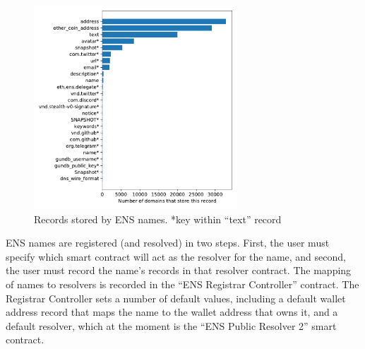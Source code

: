 \begin{figure}[t]
	\centering
	\includegraphics[width=3in]{figs/ens_names.pdf}
	\caption{Records stored by ENS names. *key within ``text'' record}
	\label{fig:ens_records}
\end{figure}

ENS names are registered (and resolved) in two steps. First, 
the user must specify which smart contract will act as the 
resolver for the name, and second, the user must record the 
name's records in 
that resolver contract. The mapping of names to resolvers is 
recorded in the ``ENS Registrar 
Controller'' contract. The Registrar Controller sets a number 
of default values, including a default wallet 
address record that maps the name to the wallet address that 
owns it, and a default resolver, which at the moment is the 
``ENS Public Resolver 2'' smart contract. 

